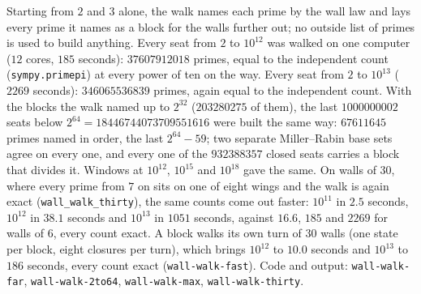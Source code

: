\documentclass[11pt]{article}
\begin{document}
Starting from $2$ and $3$ alone, the walk names each prime by the wall law and lays every prime it names as a block for the walls further out; no outside list of primes is used to build anything. Every seat from $2$ to $10^{12}$ was walked on one computer ($12$ cores, $185$ seconds): $37607912018$ primes, equal to the independent count (\texttt{sympy.primepi}) at every power of ten on the way. Every seat from $2$ to $10^{13}$ ($2269$ seconds): $346065536839$ primes, again equal to the independent count. With the blocks the walk named up to $2^{32}$ ($203280275$ of them), the last $1000000002$ seats below $2^{64} = 18446744073709551616$ were built the same way: $67611645$ primes named in order, the last $2^{64}-59$; two separate Miller--Rabin base sets agree on every one, and every one of the $932388357$ closed seats carries a block that divides it. Windows at $10^{12}$, $10^{15}$ and $10^{18}$ gave the same. On walls of $30$, where every prime from $7$ on sits on one of eight wings and the walk is again exact (\texttt{wall\_walk\_thirty}), the same counts come out faster: $10^{11}$ in $2.5$ seconds, $10^{12}$ in $38.1$ seconds and $10^{13}$ in $1051$ seconds, against $16.6$, $185$ and $2269$ for walls of $6$, every count exact. A block walks its own turn of $30$ walls (one state per block, eight closures per turn), which brings $10^{12}$ to $10.0$ seconds and $10^{13}$ to $186$ seconds, every count exact (\texttt{wall-walk-fast}). Code and output: \texttt{wall-walk-far}, \texttt{wall-walk-2to64}, \texttt{wall-walk-max}, \texttt{wall-walk-thirty}.
\end{document}
